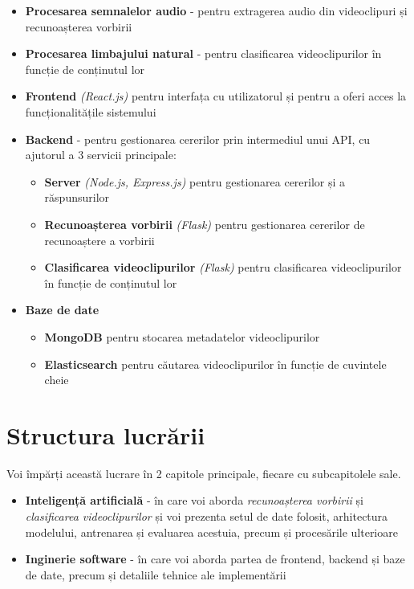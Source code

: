 \begin{itemize}
    \item \textbf{Procesarea semnalelor audio} - pentru extragerea audio din videoclipuri și recunoașterea vorbirii
    \item \textbf{Procesarea limbajului natural} - pentru clasificarea videoclipurilor în funcție de conținutul lor
    \item \textbf{Frontend} \textit{(React.js)} pentru interfața cu utilizatorul și pentru a oferi acces la funcționalitățile sistemului
    \item \textbf{Backend} - pentru gestionarea cererilor prin intermediul unui API, cu ajutorul a 3 servicii principale:
    \begin{itemize}
        \item \textbf{Server} \textit{(Node.js, Express.js)} pentru gestionarea cererilor și a răspunsurilor
        \item \textbf{Recunoașterea vorbirii} \textit{(Flask)} pentru gestionarea cererilor de recunoaștere a vorbirii
        \item \textbf{Clasificarea videoclipurilor} \textit{(Flask)} pentru clasificarea videoclipurilor în funcție de conținutul lor
    \end{itemize}
    \item \textbf{Baze de date} 
    \begin{itemize}
        \item \textbf{MongoDB} pentru stocarea metadatelor videoclipurilor
        \item \textbf{Elasticsearch} pentru căutarea videoclipurilor în funcție de cuvintele cheie
    \end{itemize}
\end{itemize}


\section{Structura lucrării}

Voi împărți această lucrare în 2 capitole principale, fiecare cu subcapitolele sale.

\begin{itemize}
    \item \textbf{Inteligență artificială} - în care voi aborda \textit{recunoașterea vorbirii} și 
    \textit{clasificarea videoclipurilor} și voi prezenta setul de date folosit, arhitectura modelului,
    antrenarea și evaluarea acestuia, precum și procesările ulterioare
    \item \textbf{Inginerie software} - în care voi aborda partea de frontend, backend și baze de date,
    precum și detaliile tehnice ale implementării
\end{itemize}